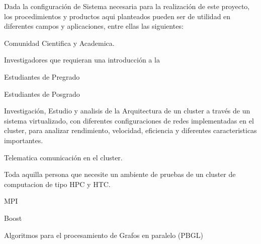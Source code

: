 Dada la configuración de Sistema necesaria para la realización de este proyecto, los procedimientos y productos aqui planteados pueden ser de utilidad en diferentes campos y aplicaciones, entre ellas las siguientes:  


Comunidad Cientifica y Academica. 

Investigadores que requieran una introducción a la

Estudiantes de Pregrado

Estudiantes de Posgrado


Investigación, Estudio y analisis de la Arquitectura de un cluster a través de un sistema virtualizado, con diferentes configuraciones de redes implementadas en el cluster, para analizar rendimiento, velocidad, eficiencia y diferentes caracteristicas importantes. 

Telematica comunicación en el cluster. 

Toda aquilla persona que necesite un ambiente de pruebas de un cluster de computacion  de tipo HPC y HTC.


MPI

Boost

Algoritmos para el procesamiento de Grafos en paralelo (PBGL)


